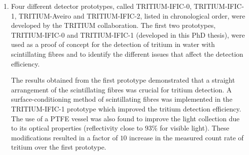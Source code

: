 \begin{enumerate}

\item{} Four different detector prototypes, called TRITIUM-IFIC-0, TRITIUM-IFIC-1, TRITIUM-Aveiro and TRITIUM-IFIC-2, listed in chronological order, were developed by the TRITIUM collaboration. The first two prototypes, TRITIUM-IFIC-0 and TRITIUM-IFIC-1 (developed in this PhD thesis), were used as a proof of concept for the detection of tritium in water with scintillating fibres and to identify the different issues that affect the detection efficiency. %

The results obtained from the first prototype demonstrated that a straight arrangement of the scintillating fibres was crucial for tritium detection. A surface-conditioning method of scintillating fibres was implemented in the TRITIUM-IFIC-1 prototype which improved the tritium detection efficiency. The use of a PTFE vessel was also found to improve the light collection due to its optical properties (reflectivity close to $93\%$ for visible light). These modifications resulted in a factor of $10$ increase in the measured count rate of tritium over the first prototype. %


\end{enumerate}
